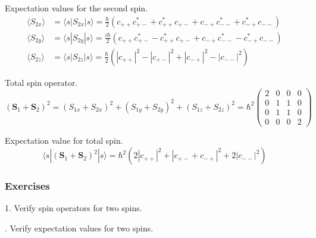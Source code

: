 Expectation values for the second spin.
\begin{align*}
\langle S_{2x}\rangle&=\langle s|S_{2x}|s\rangle
=\tfrac{\hbar}{2}
\left(c_{++}c_{+-}^*+c_{++}^*c_{+-}+c_{-+}c_{--}^*+c_{-+}^*c_{--}\right)
\\
\langle S_{2y}\rangle&=\langle s|S_{2y}|s\rangle
=\tfrac{i\hbar}{2}
\left(c_{++}c_{+-}^*-c_{++}^*c_{+-}+c_{-+}c_{--}^*-c_{-+}^*c_{--}\right)
\\
\langle S_{2z}\rangle&=\langle s|S_{2z}|s\rangle
=\tfrac{\hbar}{2}
\left(|c_{++}|^2-|c_{+-}|^2+|c_{-+}|^2-|c_{--}|^2\right)
\end{align*}

Total spin operator.
\begin{equation*}
(\mathbf S_1+\mathbf S_2)^2
=(S_{1x}+S_{2x})^2+(S_{1y}+S_{2y})^2+(S_{1z}+S_{2z})^2
=\hbar^2\begin{pmatrix}
2&0&0&0\\
0&1&1&0\\
0&1&1&0\\
0&0&0&2
\end{pmatrix}
\end{equation*}

Expectation value for total spin.
\begin{equation*}
\langle s|(\mathbf S_1+\mathbf S_2)^2|s\rangle
=\hbar^2\left(2|c_{++}|^2+|c_{+-}+c_{-+}|^2+2|c_{--}|^2\right)
\end{equation*}

\subsubsection*{Exercises}

1. Verify spin operators for two spins.

. Verify expectation values for two spins.


